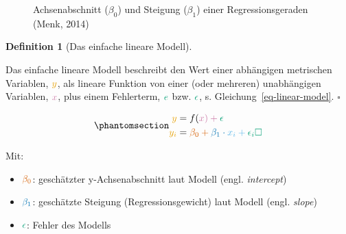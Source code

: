 \documentclass[
  letterpaper,
  twoside,
  open=any]{scrbook}
\providecommand{\tightlist}{%
  \setlength{\itemsep}{0pt}\setlength{\parskip}{0pt}}\usepackage{longtable,booktabs,array}
\theoremstyle{definition}
\theoremstyle{definition}
\theoremstyle{definition}
\newtheorem{definition}{Definition}[chapter]
\theoremstyle{remark}
\begin{document}
\begin{figure}


\caption{\label{fig-regrtex}Achsenabschnitt (\(\beta_0\)) und Steigung
(\(\beta_1\)) einer Regressionsgeraden (Menk, 2014)}

\end{figure}%

\begin{definition}[Das einfache lineare
Modell]\protect\hypertarget{def-einfache-lineare-modell}{}\label{def-einfache-lineare-modell}

Das einfache lineare Modell beschreibt den Wert einer abhängigen
metrischen Variablen, \(\color{ycol}{y}\), als lineare Funktion von
einer (oder mehreren) unabhängigen Variablen, \(\color{xcol}{x}\), plus
einem Fehlerterm, \(\color{errorcol}{e}\) bzw.
\(\color{errorcol}{\epsilon}\), s. Gleichung~\ref{eq-linear-model}.
\(\square\)

\end{definition}

\begin{equation}\phantomsection\label{eq-linear-model}{\begin{aligned}
\color{ycol}{y} &= f(\color{xcol}{x}) + \color{errorcol}{\epsilon} \\
\color{ycol}{y_i} &= \color{beta0col}{\beta_0} + \color{beta1col}{\beta_1} \cdot \color{modelcol}{x_i} + \color{errorcol}{\epsilon_i} \square
\end{aligned}}\end{equation}

Mit:

\begin{itemize}
\tightlist
\item
  \(\color{beta0col}{\beta_0}\): geschätzter y-Achsenabschnitt laut
  Modell (engl. \emph{intercept})
\item
  \(\color{beta1col}{\beta_1}\): geschätzte Steigung
  (Regressionsgewicht) laut Modell (engl. \emph{slope})
\item
  \(\color{errorcol}{\epsilon}\): Fehler des Modells
\end{itemize}
\end{document}
